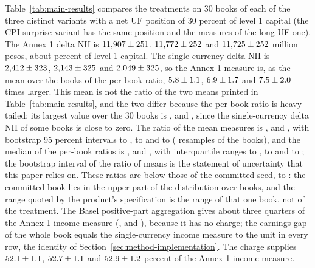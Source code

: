 Table~\ref{tab:main-results} compares the treatments on 30 books of each of the three distinct variants with a net UF position of 30 percent of level 1 capital (the CPI-surprise variant has the same position and the measures of the long UF one). The Annex 1 delta NII is $11{,}907\pm251$, $11{,}772\pm252$ and $11{,}725\pm252$ million pesos, about \mainAnnexNiiTLng{} percent of level 1 capital. The single-currency delta NII is $2{,}412\pm323$, $2{,}143\pm325$ and $2{,}049\pm325$, so the Annex 1 measure is, as the mean over the books of the per-book ratio, $5.8\pm1.1$, $6.9\pm1.7$ and $7.5\pm2.0$ times larger. This mean is not the ratio of the two means printed in Table~\ref{tab:main-results}, and the two differ because the per-book ratio is heavy-tailed: its largest value over the 30 books is \rmMaxLng{}, \rmMaxSht{} and \rmMaxOff{}, since the single-currency delta NII of some books is close to zero. The ratio of the mean measures is \rmRatioLng{}, \rmRatioSht{} and \rmRatioOff{}, with bootstrap 95 percent intervals \rmLoLng{} to \rmHiLng{}, \rmLoSht{} to \rmHiSht{} and \rmLoOff{} to \rmHiOff{} (\rmResamples{} resamples of the books), and the median of the per-book ratios is \rmMedLng{}, \rmMedSht{} and \rmMedOff{}, with interquartile ranges \rmQoneLng{} to \rmQthreeLng{}, \rmQoneSht{} to \rmQthreeSht{} and \rmQoneOff{} to \rmQthreeOff{}; the bootstrap interval of the ratio of means is the statement of uncertainty that this paper relies on. These ratios are below those of the committed seed, \repRatioLo{} to \repRatioHi{}: the committed book lies in the upper part of the distribution over books, and the range quoted by the product's specification is the range of that one book, not of the treatment. The Basel positive-part aggregation gives about three quarters of the Annex 1 income measure (\mainPosOverAnnexNiiLng{}, \mainPosOverAnnexNiiSht{} and \mainPosOverAnnexNiiOff{}), because it has no charge; the earnings gap of the whole book equals the single-currency income measure to the unit in every row, the identity of Section~\ref{sec:method-implementation}. The charge supplies $52.1\pm1.1$, $52.7\pm1.1$ and $52.9\pm1.2$ percent of the Annex 1 income measure.



